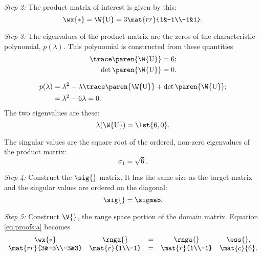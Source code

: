 \textit{Step 2:} The product matrix of interest is given by this:
\begin{equation}
  \wx{*} = \W{\mathrm{U}} = 3 \mat{rr}{1&-1\\-1&1}.
\end{equation}

\textit{Step 3:} The eigenvalues of the product matrix are the zeros of the characteristic polynomial, $p(\lambda)$. This polynomial is constructed from these quantities
\begin{equation}
  \begin{split}
    \trace \paren{\W{\mathrm{U}}} & = 6;\\
    \det \paren{\W{\mathrm{U}}}& = 0.
  \end{split}
\end{equation}

\begin{equation}
  \begin{split}
    p(\lambda) & = \lambda^{2} - \lambda \trace \paren{\W{\mathrm{U}}} +\det \paren{\W{\mathrm{U}}};\\
    &= \lambda^{2} - 6 \lambda = 0.
  \end{split}
\end{equation}
The two eigenvalues are these:
\begin{equation}
  \lambda(\W{\mathrm{U}}) = \lst{6,0}.
\end{equation}

The singular values are the square root of the ordered, non-zero eigenvalues of the product matrix:
\begin{equation}
  \sigma_{1} = \sqrt{6}.
\end{equation}

\textit{Step 4:} Construct the $\sig{}$ matrix. It has the same size as the target matrix and the singular values are ordered on the diagonal:
\begin{equation}
  \sig{} = \sigmab.
\end{equation}

\textit{Step 5:} Construct $\V{}_{}$, the range space portion of the domain matrix. Equation \eqref{eq:proofs:a} becomes
\begin{equation}
\begin{array}{ccccc}
  \wx{*}&\rnga{} &=& \rnga{}&\ess{},\\
  \mat{rr}{3&-3\\-3&3}&\mat{r}{1\\-1} &=& \mat{r}{1\\-1} & \mat{c}{6}.
\end{array}
\end{equation}

